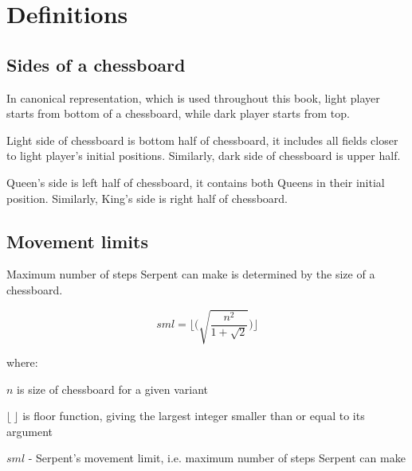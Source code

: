 

\chapter*{Definitions}
\label{ch:Definitions}

\section*{Sides of a chessboard}
\label{sec:Definitions/Sides of a chessboard}

In canonical representation, which is used throughout this book, light player
starts from bottom of a chessboard, while dark player starts from top.

Light side of chessboard is bottom half of chessboard, it includes all fields
closer to light player's initial positions. Similarly, dark side of chessboard
is upper half.

Queen's side is left half of chessboard, it contains both Queens in their initial
position. Similarly, King's side is right half of chessboard.

\clearpage %

\section*{Movement limits}
\label{sec:Definitions/Movement limits}

Maximum number of steps Serpent can make is determined by the size of a chessboard.

\begin{equation}
sml = \lfloor \bigg( \sqrt{ \frac{n^2}{1 + \sqrt{2}} } \bigg) \rfloor
\end{equation}

where:

$n$ is size of chessboard for a given variant

$\lfloor\ \rfloor$ is floor function, giving the largest integer smaller than or equal to its argument

$sml$ - Serpent's movement limit, i.e. maximum number of steps Serpent can make

